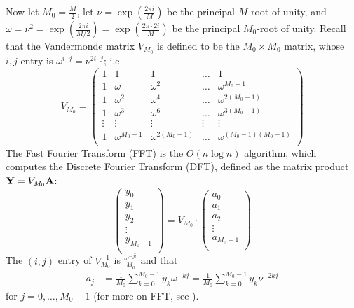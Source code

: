 Now let $M_0=\frac{M}{2}$, let
$\nu=\exp(\frac{2\pi i}{M})$ be the principal $M$-root of unity, and
$\omega=\nu^2=\exp(\frac{2\pi i}{M/2})=\exp(\frac{2\pi \cdot 2i}{M})$ be
the principal $M_0$-root of unity. Recall that the
Vandermonde matrix $V_{M_0}$ is defined to be the
$M_0 \times M_0$ matrix, whose $i,j$ entry is
$\omega^{i \cdot j} = \nu^{2 i \cdot j}$;
i.e.
$$
V_{M_0} = \left(
\begin{array}{rrrrr}
1&1&1&\dots&1\\
1&\omega&\omega^2&\dots&\omega^{M_0-1}\\
1&\omega^2&\omega^4&\dots&\omega^{2(M_0-1)}\\
1&\omega^3&\omega^6&\dots&\omega^{3(M_0-1)}\\
\vdots& \vdots& \vdots& \vdots& \vdots\\
1&\omega^{M_0-1}&\omega^{2(M_0-1)}&\dots&\omega^{(M_0-1)(M_0-1)}\\
\end{array}
\right)
$$
The Fast Fourier Transform (FFT) is the $O(n \log n)$
algorithm, which computes the Discrete Fourier Transform (DFT), defined
as the matrix product ${\bf Y} = V_{M_0} {\bf A}$:
$$
\left(
\begin{array}{l}
y_0\\
y_1\\
y_2\\
\vdots \\
y_{M_0-1}\\
\end{array}
\right)
= V_{M_0} \cdot
\left(
\begin{array}{l}
a_0\\
a_1\\
a_2\\
\vdots \\
a_{M_0-1}\\
\end{array}
\right)
$$
The $(i,j)$ entry of $V_{M_0}^{-1}$ is $\frac{\omega^{-j i}}{M_0}$
and that
\begin{align}
\label{eqn:ajdef}
a_j &=\frac{1}{M_0} \sum_{k=0}^{M_0-1} y_k \omega^{-kj}
=\frac{1}{M_0} \sum_{k=0}^{M_0-1} y_k \nu^{-2kj}
\end{align}
for $j=0,\dots,M_0-1$ (for more on FFT, see \cite{cormen}).

